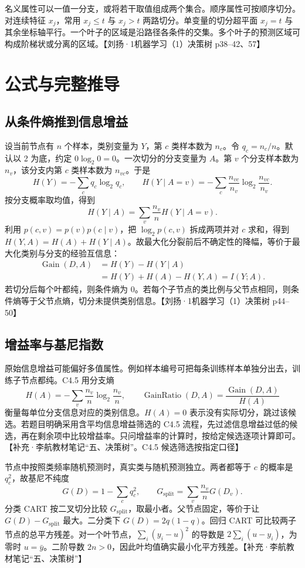 \documentclass[UTF8,a4paper,zihao=-4,fontset=fandol]{ctexrep}
\begin{document}
名义属性可以一值一分支，或将若干取值组成两个集合。顺序属性可按顺序切分。对连续特征 $x_j$，常用 $x_j\le t$ 与 $x_j>t$ 两路切分。单变量的切分超平面 $x_j=t$ 与其余坐标轴平行。一个叶子的区域是沿路径各条件的交集。多个叶子的预测区域可构成阶梯状或分离的区域。【刘扬·1机器学习（1）决策树 p38–42、57】

\section{公式与完整推导}
\subsection*{从条件熵推到信息增益}
设当前节点有 $n$ 个样本，类别变量为 $Y$，第 $c$ 类样本数为 $n_c$。令 $q_c=n_c/n$。默认以 2 为底，约定 $0\log_2 0=0$。一次切分的分支变量为 $A$。第 $v$ 个分支样本数为 $n_v$，该分支内第 $c$ 类样本数为 $n_{vc}$。于是
\[
 H(Y)=-\sum_c q_c\log_2q_c,\qquad
 H(Y\mid A=v)=-\sum_c\frac{n_{vc}}{n_v}\log_2\frac{n_{vc}}{n_v}.
\]
按分支概率取均值，得到
\[
 H(Y\mid A)
   =\sum_v\frac{n_v}{n}H(Y\mid A=v).
\]
利用 $p(c,v)=p(v)p(c\mid v)$，把 $\log_2 p(c,v)$ 拆成两项并对 $c$ 求和，得到 $H(Y,A)=H(A)+H(Y\mid A)$。故最大化分裂前后不确定性的降幅，等价于最大化类别与分支的经验互信息：
\begin{align*}
 \operatorname{Gain}(D,A)
 &=H(Y)-H(Y\mid A)\\
 &=H(Y)+H(A)-H(Y,A)=I(Y;A).
\end{align*}
若切分后每个叶都纯，则条件熵为 0。若每个子节点的类比例与父节点相同，则条件熵等于父节点熵，切分未提供类别信息。【刘扬·1机器学习（1）决策树 p44–50】

\subsection*{增益率与基尼指数}
原始信息增益可能偏好多值属性。例如样本编号可把每条训练样本单独分出去，训练子节点都纯。C4.5 用分支熵
\[
 H(A)=-\sum_v\frac{n_v}{n}\log_2\frac{n_v}{n},
 \qquad
 \operatorname{GainRatio}(D,A)=\frac{\operatorname{Gain}(D,A)}{H(A)}
\]
衡量每单位分支信息对应的类别信息。$H(A)=0$ 表示没有实际切分，跳过该候选。若题目明确采用含平均信息增益筛选的 C4.5 流程，先过滤信息增益过低的候选，再在剩余项中比较增益率。只问增益率的计算时，按给定候选逐项计算即可。【补充·李航教材笔记“五、决策树”。C4.5 候选筛选按指定口径】

节点中按照类频率随机预测时，真实类与随机预测独立。两者都等于 $c$ 的概率是 $q_c^2$，故基尼不纯度
\[
 G(D)=1-\sum_c q_c^2,\qquad
 G_{\mathrm{split}}=\sum_v\frac{n_v}{n}G(D_v).
\]
分类 CART 按二叉切分比较 $G_{\mathrm{split}}$，取最小者。父节点固定，等价于让 $G(D)-G_{\mathrm{split}}$ 最大。二分类下 $G(D)=2q(1-q)$。回归 CART 可比较两子节点的总平方残差。对一个叶节点，$\sum_i(y_i-u)^2$ 的导数是 $2\sum_i(u-y_i)$，为零时 $u=\bar y$。二阶导数 $2n>0$，因此叶均值确实最小化平方残差。【补充·李航教材笔记“五、决策树”】
\end{document}
